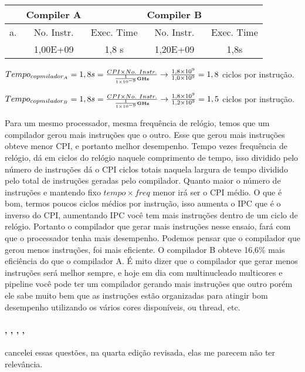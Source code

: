 \documentclass{article}
\begin{document}
\begin{tabular}{|c|c|c|c|c|}
\hline    & Compiler A &            & Compiler B &            \\
\hline a. & No. Instr. & Exec. Time & No. Instr. & Exec. Time \\
\hline    & 1,00E+09   & 1,8 s      & 1,20E+09   & 1,8s       \\
\hline
\end{tabular}

$Tempo_{copmilador_{A}} = 1,8s = \frac{CPI \times No.\ Instr.}{\frac{1}{1 \times
10^{-9}} \textbf{\tiny GHz}} \rightarrow \frac{1,8 \times 10^{9}}{1,0 \times
10^{9}} = 1,8$ ciclos por instrução.

$Tempo_{copmilador_{B}} = 1,8s = \frac{CPI \times No.\ Instr.}{\frac{1}{1 \times
10^{-9}} \textbf{\tiny GHz}} \rightarrow \frac{1,8 \times 10^{9}}{1,2 \times
10^{9}} = 1,5$ ciclos por instrução.

Para um mesmo processador, mesma frequência de relógio, temos que um compilador
gerou mais instruções que o outro. Esse que gerou mais instruções obteve menor
CPI, e portanto melhor desempenho. Tempo vezes frequência de relógio, dá em
ciclos do relógio naquele comprimento de tempo, isso dividido pelo número de
instruções dá o CPI ciclos totais naquela largura de tempo dividido pelo total
de instruções geradas pelo compilador. Quanto maior o número de instruções e
mantendo fixo $tempo \times freq$ menor irá ser o CPI médio. O que é bom, termos
poucos ciclos médios por instrução, isso aumenta o IPC que é o inverso do CPI,
aumentando IPC você tem mais instruções dentro de um ciclo de relógio. Portanto
o compilador que gerar mais instruções nesse ensaio, fará com que o processador
tenha mais desempenho. Podemos pensar que o compilador que gerou menos
instruções, foi mais eficiente. O compilador B obteve 16,6\% mais eficiência do
que o compilador A. É mito dizer que o compilador que gerar menos instruções
será melhor sempre, e hoje em dia com multinucleado multicores e pipeline você
pode ter um compilador gerando mais instruções que outro porém ele sabe muito
bem que as instruções estão organizadas para atingir bom desempenho utilizando
os vários cores disponíveis, ou thread, etc.

\paragraph {
  ,
  ,
  ,
  , 
} cancelei essas questões, na quarta edição revisada, elas me parecem não ter 
relevância.
\end{document}
